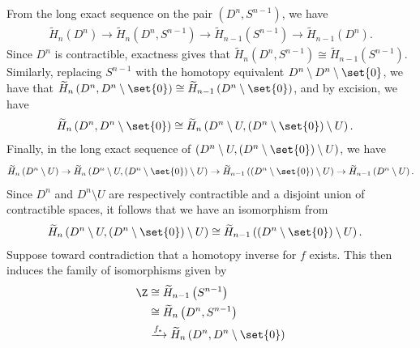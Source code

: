 \documentclass[10pt]{mypackage}
\begin{document}
\begin{solution}
  From the long exact sequence on the pair $\left( D^n,S^{n-1} \right)$, we have
  \begin{align*}
    \widetilde{H}_{n}\left( D^n \right)\rightarrow \widetilde{H}_{n}\left( D^{n},S^{n-1} \right) \rightarrow \widetilde{H}_{n-1} \left( S^{n-1} \right) \rightarrow \widetilde{H}_{n-1}\left( D^{n} \right).
  \end{align*}
  Since $D^n$ is contractible, exactness gives that $\widetilde{H}_n\left( D^{n},S^{n-1} \right)\cong \widetilde{H}_{n-1}\left( S^{n-1} \right)$. Similarly, replacing $S^{n-1}$ with the homotopy equivalent $D^{n}\setminus D^{n}\setminus\set{0}$, we have that $ \widetilde{H}_n\left( D^n,D^n\setminus\set{0} \right)\cong \widetilde{H}_{n-1}\left( D^n\setminus\set{0} \right) $, and by excision, we have 
  \begin{align*}
    \widetilde{H}_n\left( D^n,D^n\setminus\set{0} \right) &\cong \widetilde{H}_n\left( D^n\setminus U,\left( D^n\setminus\set{0} \right)\setminus U \right).
  \end{align*}
  Finally, in the long exact sequence of $\left( D^n\setminus U,\left( D^n\setminus\set{0} \right)\setminus U \right)$, we have
  \begin{align*}
    \widetilde{H}_n\left( D^n\setminus U \right)\rightarrow \widetilde{H}_n\left( D^n\setminus U,\left( D^n\setminus\set{0} \right)\setminus U \right)\rightarrow \widetilde{H}_{n-1}\left( \left( D^n\setminus\set{0} \right)\setminus U \right)\rightarrow \widetilde{H}_{n-1}\left( D^n\setminus U \right).
  \end{align*}
  Since $D^n$ and $D^n\setminus U$ are respectively contractible and a disjoint union of contractible spaces, it follows that we have an isomorphism from 
  \begin{align*}
    \widetilde{H}_n\left( D^n\setminus U,\left( D^n\setminus\set{0} \right)\setminus U \right) &\cong \widetilde{H}_{n-1}\left( \left( D^n\setminus\set{0} \right)\setminus U \right).
  \end{align*}
  Suppose toward contradiction that a homotopy inverse for $f$ exists. This then induces the family of isomorphisms given by
  \begin{align*}
    \Z &\cong \widetilde{H}_{n-1}\left( S^{n-1} \right)\\
    &\cong \widetilde{H}_{n}\left( D^n,S^{n-1} \right)\\
                                              &\xrightarrow{f_{\ast}} \widetilde{H}_n\left( D^n,D^n\setminus\set{0} \right)\\

\end{align*}
\end{solution}
\end{document}
